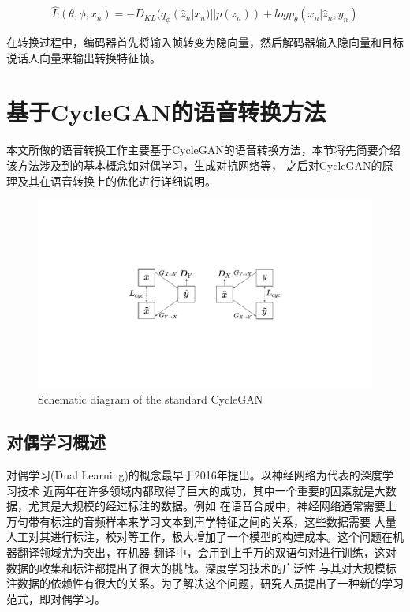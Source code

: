 \begin{equation}
    \hat{L}(\theta,\phi,x_n)=-D_{KL}(q_{\phi}(\hat{z}_n|x_n)||p(z_n))+logp_{\theta}(x_n|\hat{z}_n,y_n)
\end{equation}

在转换过程中，编码器首先将输入帧转变为隐向量，然后解码器输入隐向量和目标说话人向量来输出转换特征帧。


\section{基于CycleGAN的语音转换方法}
本文所做的语音转换工作主要基于CycleGAN的语音转换方法，本节将先简要介绍该方法涉及到的基本概念如对偶学习，生成对抗网络等，
之后对CycleGAN的原理及其在语音转换上的优化进行详细说明。

\begin{figure}[!htp]
    \centering
    \includegraphics[width=13cm,trim=100 140 100 140,clip]{figure/3_cyclegan.pdf}
    {Schematic diagram of the standard CycleGAN}
    \label{fig:cyclegan}
\end{figure}

\subsection{对偶学习概述}
对偶学习(Dual Learning)的概念最早于2016年提出\cite{he2016dual}。以神经网络为代表的深度学习技术
近两年在许多领域内都取得了巨大的成功，其中一个重要的因素就是大数据，尤其是大规模的经过标注的数据。例如
在语音合成中，神经网络通常需要上万句带有标注的音频样本来学习文本到声学特征之间的关系，这些数据需要
大量人工对其进行标注，校对等工作，极大增加了一个模型的构建成本。这个问题在机器翻译领域尤为突出，在机器
翻译中，会用到上千万的双语句对进行训练，这对数据的收集和标注都提出了很大的挑战。深度学习技术的广泛性
与其对大规模标注数据的依赖性有很大的关系。为了解决这个问题，研究人员提出了一种新的学习范式，即对偶学习。

